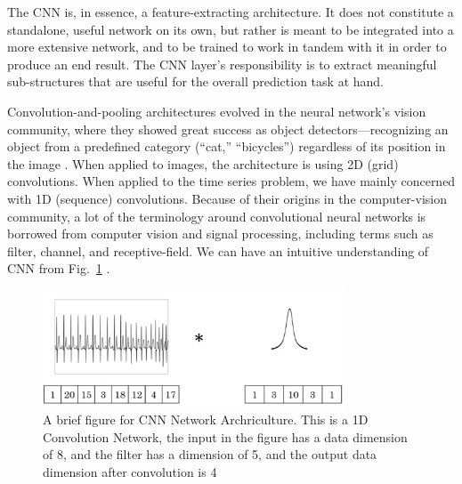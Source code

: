 \documentclass{article}
\begin{document}
The CNN is, in essence, a feature-extracting architecture. It does not constitute a standalone, useful network on its own, but rather is meant to be integrated into a more extensive network, and to be trained to work in tandem with it in order to produce an end result. The CNN layer's responsibility is to extract meaningful sub-structures that are useful for the overall prediction task at hand.

Convolution-and-pooling architectures evolved in the neural network's vision community, where they showed great success as object detectors—recognizing an object from a predefined category (“cat,” “bicycles”) regardless of its position in the image \citep{DBLP:journals/corr/WangC13b}. When applied to images, the architecture is using 2D (grid) convolutions. When applied to the time series problem, we have mainly concerned with 1D (sequence) convolutions. Because of their origins in the computer-vision community, a lot of the terminology around convolutional neural networks is borrowed from computer vision and signal processing, including terms such as filter, channel, and receptive-field.
We can have an intuitive understanding of CNN from Fig.~\ref{fig:CNN_figure} .


\begin{figure}[!htp]
	\begin{centering}
		\includegraphics[width=0.8\textwidth]{Conv1D.png}
		\caption{A brief figure for CNN Network Archriculture. This is a 1D Convolution Network, the input in the figure has a data dimension of 8, and the filter has a dimension of 5, and the output data dimension after convolution is 4}
		\label{fig:CNN_figure} 
	\end{centering}
\end{figure}
\end{document}
